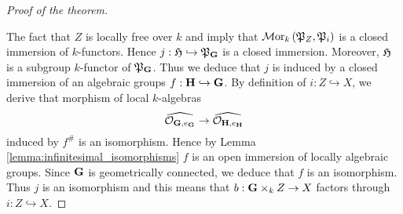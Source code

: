 \begin{proof}[Proof of the theorem]
\begin{center}
\end{center}
The fact that $Z$ is locally free over $k$ and {\cite[Theorem 6.2]{kfunctors}} imply that $\mathcal{M}\mathrm{or}_k\left({\mathfrak P}_{Z},{\mathfrak P}_{i}\right)$ is a closed immersion of $k$-functors. Hence $j:{\mathfrak H} \hookrightarrow {\mathfrak P}_{\mathbf{G}}$ is a closed immersion. Moreover, ${\mathfrak H}$ is a subgroup $k$-functor of ${\mathfrak P}_{\mathbf{G}}$. Thus we deduce that $j$ is induced by a closed immersion of an algebraic groups $f:\mathbf{H} \hookrightarrow \mathbf{G}$. By definition of $i:Z\hookrightarrow X$, we derive that morphism of local $k$-algebras
$$\widehat{{\mathcal O}_{\mathbf{G},e_{\mathbf{G}}}} \rightarrow  \widehat{{\mathcal O}_{\mathbf{H},e_{\mathbf{H}}}}$$
induced by $f^{\#}$ is an isomorphism. Hence by Lemma \ref{lemma:infinitesimal_isomorphisms} $f$ is an open immersion of locally algebraic groups. Since $\mathbf{G}$ is geometrically connected, we deduce that $f$ is an isomorphism. Thus $j$ is an isomorphism and this means that $b:\mathbf{G}\times_k Z\rightarrow X$ factors through $i:Z\hookrightarrow X$.
\end{proof}

























































\small







